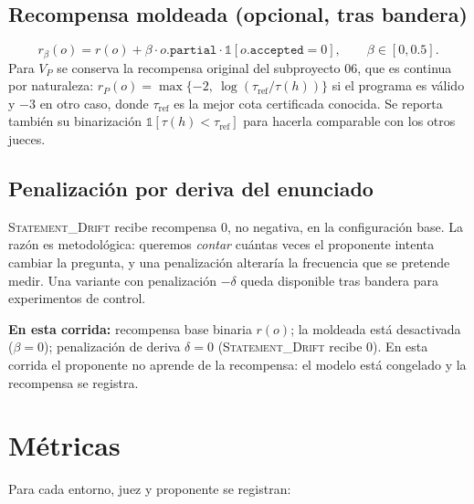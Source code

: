 \documentclass[11pt,a4paper]{article}
\begin{document}
\subsection{Recompensa moldeada (opcional, tras bandera)}
\[
  r_\beta(o) = r(o) + \beta \cdot o.\texttt{partial} \cdot \mathbb{1}[o.\texttt{accepted}=0],\qquad \beta \in [0, 0.5].
\]
Para $V_P$ se conserva la recompensa original del subproyecto 06, que es continua por naturaleza: $r_P(o) = \max\{-2,\ \log(\tau_{\mathrm{ref}}/\tau(h))\}$ si el programa es válido y $-3$ en otro caso, donde $\tau_{\mathrm{ref}}$ es la mejor cota certificada conocida. Se reporta también su binarización $\mathbb{1}[\tau(h) < \tau_{\mathrm{ref}}]$ para hacerla comparable con los otros jueces.

\subsection{Penalización por deriva del enunciado}
\textsc{Statement\_Drift} recibe recompensa $0$, no negativa, en la configuración base. La razón es metodológica: queremos \emph{contar} cuántas veces el proponente intenta cambiar la pregunta, y una penalización alteraría la frecuencia que se pretende medir. Una variante con penalización $-\delta$ queda disponible tras bandera para experimentos de control.

\medskip\noindent\textbf{En esta corrida:} recompensa base binaria $r(o)$; la moldeada está desactivada ($\beta = 0$); penalización de deriva $\delta = 0$ (\textsc{Statement\_Drift} recibe $0$). En esta corrida el proponente no aprende de la recompensa: el modelo está congelado y la recompensa se registra.

\section{Métricas}



Para cada entorno, juez y proponente se registran:
\end{document}
